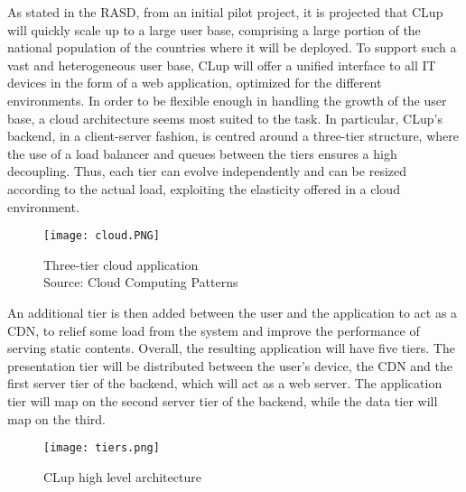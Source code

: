 \documentclass[../../main.tex]{subfiles}
\begin{document}
As stated in the RASD, from an initial pilot project, it is projected that CLup will quickly scale up to a large user base, 
comprising a large portion of the national population of the countries where it will be deployed. 
To support such a vast and heterogeneous user base, 
CLup will offer a unified interface to all IT devices in the form of a web application, optimized for the different environments.
In order to be flexible enough in handling the growth of the user base, a cloud architecture seems most suited to the task. 
In particular, CLup's backend, in a client-server fashion, is centred around a three-tier structure, where the use of a load balancer 
and queues between the tiers ensures a high decoupling. 
Thus, each tier can evolve independently and can be resized according to the actual load, 
exploiting the elasticity offered in a cloud environment.

\begin{figure}[H]
    \centering
    \texttt{[image: cloud.PNG]}
    \caption{
        Three-tier cloud application\\
        Source: Cloud Computing Patterns
    }
\end{figure}

An additional tier is then added between the user and the application to act as a CDN, to relief some load from the system and improve the performance of serving static contents. Overall,
 the resulting application will have five tiers.
The presentation tier will be distributed between the user's device, the CDN and the first server tier of the backend, which will act as a web server. The application tier will map on the second server tier of the backend, while the data tier will map on the third.


\begin{figure}[H]
    \centering
    \texttt{[image: tiers.png]}
    \caption{
        CLup high level architecture
    }
\end{figure}
\end{document}

